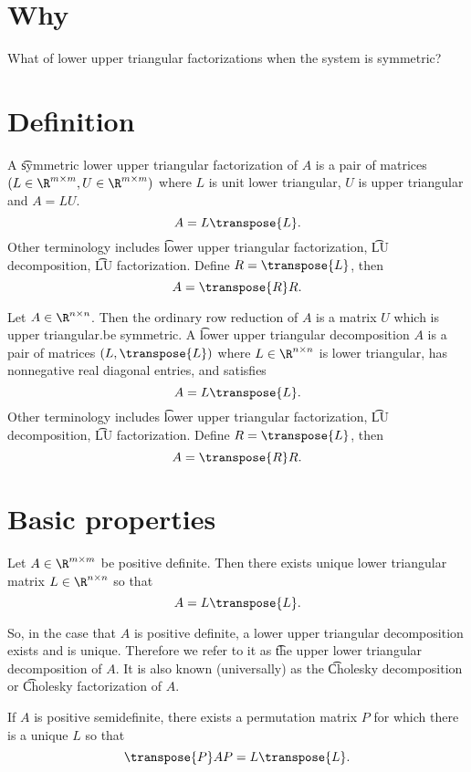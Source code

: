 
\section*{Why}

What of lower upper triangular factorizations when the system is symmetric?

\section*{Definition}

A \t{symmetric lower upper triangular factorization} of $A$ is a pair of matrices $(L \in \R ^{m \times m}, U \in \R ^{m \times m})$ where $L$ is unit lower triangular, $U$ is upper triangular and $A = LU$.
\[
A = L\transpose{L}.
\]
Other terminology includes \t{lower upper triangular factorization}, \t{LU decomposition}, \t{LU factorization}.
Define $R = \transpose{L}$, then
\[
A = \transpose{R}R.
\]

Let $A \in \R ^{n \times  n}$.
Then the ordinary row reduction of $A$ is a matrix $U$ which is upper triangular.be symmetric.
A \t{lower upper triangular decomposition}
$A$ is a pair of matrices $(L, \transpose{L})$ where $L \in \R ^{n \times n}$ is lower triangular, has nonnegative real diagonal entries, and satisfies
\[
A = L\transpose{L}.
\]
Other terminology includes \t{lower upper triangular factorization}, \t{LU decomposition}, \t{LU factorization}.
Define $R = \transpose{L}$, then
\[
A = \transpose{R}R.
\]

\section*{Basic properties}

\begin{proposition}
Let $A \in \R ^{m \times m}$ be positive definite. Then there exists unique lower triangular matrix $L \in \R ^{n \times n}$ so that
\[
A = L\transpose{L}.
\]
\end{proposition}

So, in the case that $A$ is positive definite, a lower upper triangular decomposition exists and is unique.
Therefore we refer to it as \t{the upper lower triangular decomposition} of $A$.
It is also known (universally) as the \t{Cholesky decomposition} or \t{Cholesky factorization} of $A$.

\begin{proposition}
If $A$ is positive semidefinite, there exists a permutation matrix $P$ for which there is a unique $L$ so that
\[
\transpose{P}AP = L\transpose{L}.
\]
\end{proposition}

